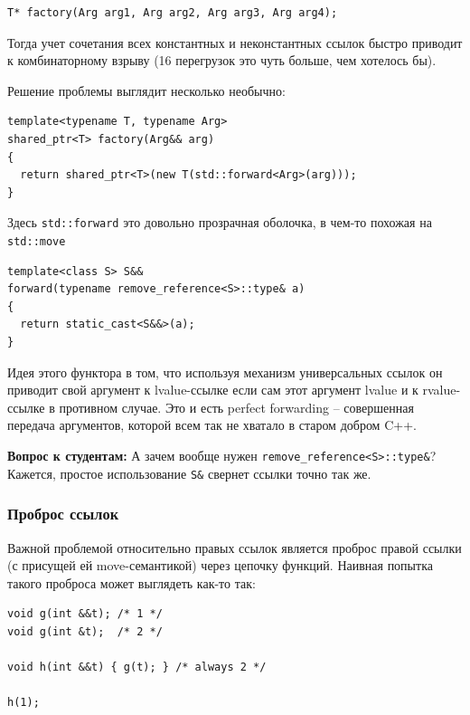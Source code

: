 \documentclass[a4paper,12pt,oneside]{article}
\newif\ifanswers
\begin{document}
\begin{lstlisting}
T* factory(Arg arg1, Arg arg2, Arg arg3, Arg arg4);
\end{lstlisting}

Тогда учет сочетания всех константных и неконстантных ссылок быстро приводит к комбинаторному взрыву (16 перегрузок это чуть больше, чем хотелось бы).

Решение проблемы выглядит несколько необычно:

\begin{lstlisting}
template<typename T, typename Arg> 
shared_ptr<T> factory(Arg&& arg)
{ 
  return shared_ptr<T>(new T(std::forward<Arg>(arg)));
} 
\end{lstlisting}

Здесь \lstinline!std::forward! это довольно прозрачная оболочка, в чем-то похожая на \lstinline!std::move!

\begin{lstlisting}
template<class S> S&& 
forward(typename remove_reference<S>::type& a)
{
  return static_cast<S&&>(a);
} 
\end{lstlisting}

Идея этого функтора в том, что используя механизм универсальных ссылок он приводит свой аргумент к lvalue-ссылке если сам этот аргумент lvalue и к rvalue-ссылке в противном случае. Это и есть perfect forwarding -- совершенная передача аргументов, которой всем так не хватало в старом добром C++.

\textbf{Вопрос к студентам:} А зачем вообще нужен \lstinline!remove_reference<S>::type&!? Кажется, простое использование \lstinline!S&! свернет ссылки точно так же.

\ifanswers
Ответ: это исключает неявный вывод параметра для шаблона.
\fi

\subsubsection{Проброс ссылок}\label{PerfectForwRef}

Важной проблемой относительно правых ссылок является проброс правой ссылки (с присущей ей move-семантикой) через цепочку функций. Наивная попытка такого проброса может выглядеть как-то так:

\begin{lstlisting}
void g(int &&t); /* 1 */
void g(int &t);  /* 2 */

void h(int &&t) { g(t); } /* always 2 */

h(1);
\end{lstlisting}
\end{document}
